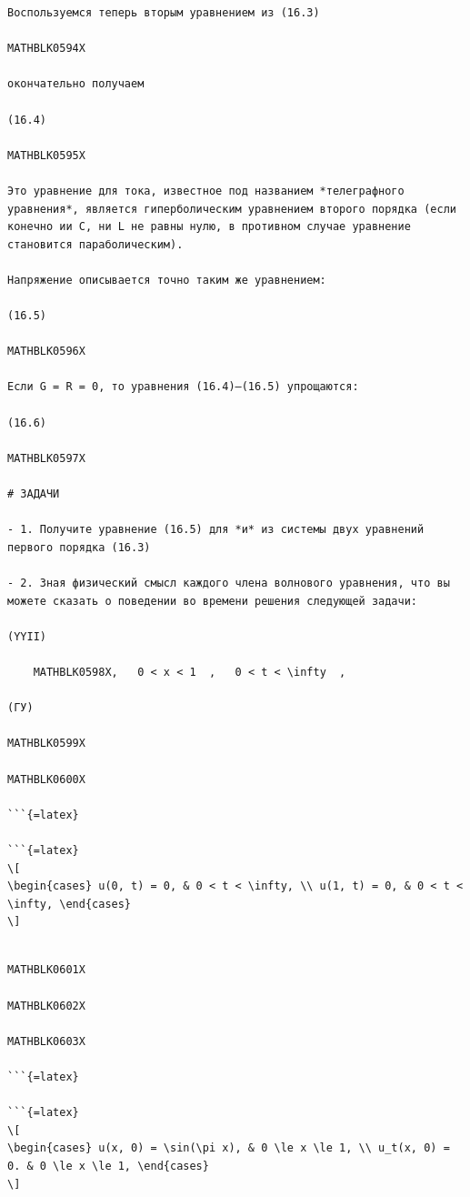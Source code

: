 \documentclass[
]{article}
\begin{document}
\begin{verbatim}
Воспользуемся теперь вторым уравнением из (16.3)

MATHBLK0594X

окончательно получаем

(16.4)

MATHBLK0595X

Это уравнение для тока, известное под названием *телеграфного уравнения*, является гиперболическим уравнением второго порядка (если конечно ии C, ни L не равны нулю, в противном случае уравнение становится параболическим).

Напряжение описывается точно таким же уравнением:

(16.5)

MATHBLK0596X

Если G = R = 0, то уравнения (16.4)—(16.5) упрощаются:

(16.6)

MATHBLK0597X

# ЗАДАЧИ

- 1. Получите уравнение (16.5) для *и* из системы двух уравнений первого порядка (16.3)

- 2. Зная физический смысл каждого члена волнового уравнения, что вы можете сказать о поведении во времени решения следующей задачи:

(YYII)

    MATHBLK0598X,   0 < x < 1  ,   0 < t < \infty  ,

(ГУ)

MATHBLK0599X

MATHBLK0600X

```{=latex}

```{=latex}
\[
\begin{cases} u(0, t) = 0, & 0 < t < \infty, \\ u(1, t) = 0, & 0 < t < \infty, \end{cases}
\]
\end{verbatim}

\begin{verbatim}

MATHBLK0601X

MATHBLK0602X

MATHBLK0603X

```{=latex}

```{=latex}
\[
\begin{cases} u(x, 0) = \sin(\pi x), & 0 \le x \le 1, \\ u_t(x, 0) = 0. & 0 \le x \le 1, \end{cases}
\]
\end{verbatim}
\end{document}
